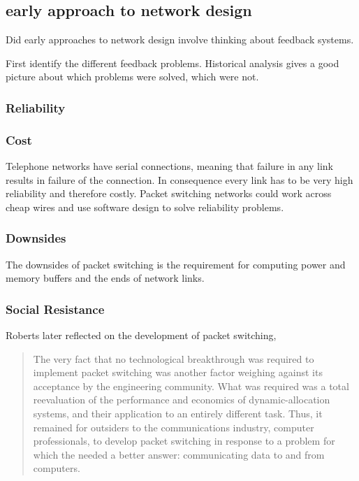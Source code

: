 \subsection{early approach to network design}

Did early approaches to network design involve thinking about feedback systems.

First identify the different feedback problems. Historical analysis gives a good picture about which
problems were solved, which were not.


\subsubsection{Reliability}

\subsubsection{Cost}

Telephone networks have serial connections, meaning that failure in any link results in failure of
the connection. In consequence every link has to be very high reliability and therefore costly.
Packet switching networks could work across cheap wires and use software design to solve reliability
problems.

\subsubsection{Downsides}

The downsides of packet switching is the requirement for computing power and memory buffers and the
ends of network links.

\subsubsection{Social Resistance}

Roberts\cite{roberts1978} later reflected on the development of packet switching,

\begin{quote}
The very fact that no technological breakthrough was required to implement packet switching was
another factor weighing against its acceptance by the engineering community. What was required was a
total reevaluation of the performance and economics of dynamic-allocation systems, and their
application to an entirely different task. Thus, it remained for outsiders to the communications
industry, computer professionals, to develop packet switching in response to a problem for which the
    needed a better answer: communicating data to and from computers.
\end{quote}


